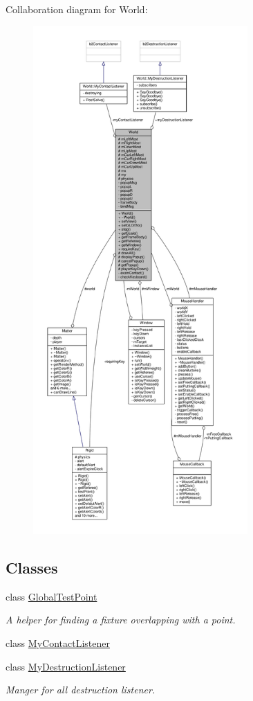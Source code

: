 Collaboration diagram for World\+:
\nopagebreak
\begin{figure}[H]
\begin{center}
\leavevmode
\includegraphics[height=550pt]{classWorld__coll__graph}
\end{center}
\end{figure}
\subsection*{Classes}
\begin{DoxyCompactItemize}
\item 
class \hyperlink{classWorld_1_1GlobalTestPoint}{Global\+Test\+Point}
\begin{DoxyCompactList}\small\item\em A helper for finding a fixture overlapping with a point. \end{DoxyCompactList}\item 
class \hyperlink{classWorld_1_1MyContactListener}{My\+Contact\+Listener}
\item 
class \hyperlink{classWorld_1_1MyDestructionListener}{My\+Destruction\+Listener}
\begin{DoxyCompactList}\small\item\em Manger for all destruction listener. \end{DoxyCompactList}\end{DoxyCompactItemize}
